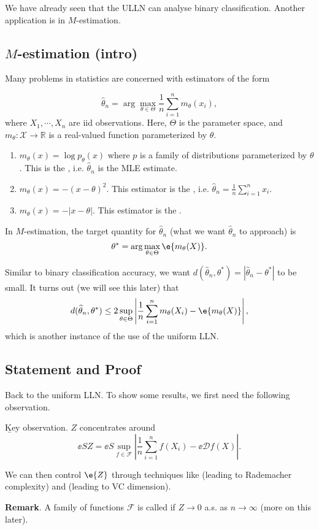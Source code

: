 We have already seen that the ULLN can analyse binary classification. Another application is in $M$-estimation.

\subsection{$M$-estimation (intro)}

Many problems in statistics are concerned with estimators of the form 

\[
    \widehat{\theta}_n = \arg\max_{\theta\in\Theta} \frac{1}{n}\sum_{i=1}^n m_{\theta}(x_i),
\]
where $X_1, \cdots, X_n$ are iid observations. Here, $\Theta$ is the parameter space, and $m_{\theta} : \mathcal X \to \mathbb R$ is a real-valued function parameterized by $\theta$.

\begin{example}

    \noindent
    \begin{enumerate}
        \item $m_\theta(x) = \log p_\theta(x)$ where $p$ is a family of distributions parameterized by $\theta$. This is the , i.e. $\widehat{\theta}_n$ is the MLE estimate.
        \item $m_\theta(x) = -(x - \theta)^2$. This estimator is the , i.e. $\widehat{\theta}_n = \frac{1}{n}\sum_{i=1}^n x_i$.
        \item $m_\theta(x) = -|x - \theta|$. This estimator is the .
    \end{enumerate}
\end{example}

In $M$-estimation, the target quantity for $\widehat{\theta}_n$ (what we want $\widehat{\theta}_n$ to approach) is 
\[
\theta^* = \arg\max_{\theta\in\Theta} \e{m_{\theta}(X)}.
\]

Similar to binary classification accuracy, we want $d(\widehat{\theta}_n, \theta^*) = |\widehat{\theta}_n - \theta^*|$ to be small. It turns out (we will see this later) that
\[
    d(\widehat{\theta}_n, \theta^*) \leq 2\sup_{\theta\in\Theta} \left| \frac{1}{n}\sum_{i=1}^n m_{\theta}(X_i) - \e{m_{\theta}(X)} \right|,
\]
which is another instance of the use of the uniform LLN.

\subsection{Statement and Proof}

Back to the uniform LLN. To show some results, we first need the following observation.

\b{Key observation}. $Z$ concentrates around \[\displaystyle{\ee{S}{Z} = \ee{S}{\sup_{f\in\mathcal F} \left| \frac{1}{n} \sum_{i=1}^n f(X_i) - \ee{\mathcal D}{f(X)} \right|}}.\]

We can then control $\e{Z}$ through techniques like  (leading to Rademacher complexity) and  (leading to VC dimension).

\textbf{Remark}. A family of functions $\mathcal F$ is called  if $Z \to 0$ a.s. as $n \to \infty$ (more on this later).